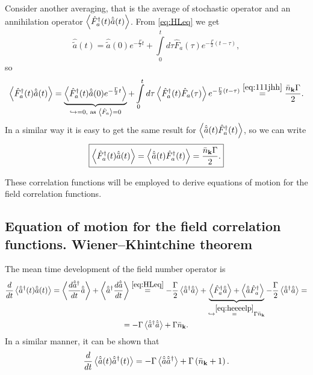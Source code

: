 Consider another averaging, that is the average of stochastic operator and an annihilation operator $\left\langle {\hat{F}_a^{\dagger}(t) \hat{\tilde{a}}(t)} \right\rangle$.
From \eqref{eq:HLeq} we get
\begin{equation}
	\hat{\tilde{a}}(t) = \hat{\tilde{a}}(0) e^{- \frac{\Gamma}{2}t} + \int \limits_0^t  d \tau \hat{F}_a(\tau)e^{- \frac{\Gamma}{2}(t - \tau)},
\end{equation}
so
\begin{equation}
	\left\langle {\hat{F}_a^{\dagger}(t) \hat{\tilde{a}}(t)} \right\rangle = \underbrace{\left\langle {\hat{F}_a^{\dagger}(t) \hat{\tilde{a}}(0)e^{- \frac{\Gamma}{2}t}} \right\rangle}_{\hookrightarrow=0, \text{ as } \left\langle {\hat{F}_a} \right\rangle=0} + \int \limits_0^t d\tau \left\langle {\hat{F}_a^{\dagger}(t) \hat{F}_a(\tau)} \right\rangle e^{- \frac{\Gamma}{2}(t - \tau)} \overset{\eqref{eq:111jhh}}{=} \frac{\bar{n}_{\mathbf{k}}\Gamma}{2}.
\end{equation}
In a similar way it is easy to get the same result for $\left\langle {\hat{\tilde{a}}(t) \hat{F}_a^{\dagger}(t) } \right\rangle$, so we can write
\begin{equation}
	\boxed{	\left\langle {\hat{F}_a^{\dagger}(t) \hat{\tilde{a}}(t)} \right\rangle = \left\langle {\hat{\tilde{a}}(t) \hat{F}_a^{\dagger}(t) } \right\rangle =  \frac{\bar{n}_{\mathbf{k}}\Gamma}{2}.}
	\label{eq:heeeelp}
\end{equation}

These correlation functions will be employed to derive equations of motion for the field correlation functions.

\subsection{Equation of motion for the field correlation functions. Wiener--Khintchine theorem}

The mean time development of the field number operator is
\begin{multline}
	\frac{d}{dt} \left\langle {\hat{\tilde{a}}^{\dagger}(t) \hat{\tilde{a}}(t)} \right\rangle  = \left\langle { \frac{d\hat{\tilde{a}}^{\dagger}}{dt} \hat{\tilde{a}}} \right\rangle + \left\langle {\hat{\tilde{a}}^{\dagger} \frac{d\hat{\tilde{a}}}{dt}} \right\rangle \overset{\eqref{eq:HLeq}}{=} - \frac{\Gamma}{2} \left\langle {\hat{\tilde{a}}^{\dagger} \hat{\tilde{a}}} \right\rangle + \underbrace{\left\langle {\hat{F}_a^{\dagger} \hat{\tilde{a}}} \right\rangle + \left\langle {\hat{\tilde{a}} \hat{F}_a^{\dagger}} \right\rangle}_{\hookrightarrow \overset{\eqref{eq:heeeelp}}{=} \Gamma \bar{n}_{\mathbf{k}}}  - \frac{\Gamma}{2} \left\langle {\hat{\tilde{a}}^{\dagger} \hat{\tilde{a}}} \right\rangle = \\ = - \Gamma \left\langle {\hat{\tilde{a}}^{\dagger} \hat{\tilde{a}}} \right\rangle + \Gamma \bar{n}_{\mathbf{k}}.
	\label{eq:dn}
\end{multline}
In a similar manner, it can be shown that
\begin{equation}
	\frac{d}{dt} \left\langle {\hat{\tilde{a}}(t) \hat{\tilde{a}}^{\dagger}(t)} \right\rangle = - \Gamma \left\langle {\hat{\tilde{a}} \hat{\tilde{a}}^{\dagger}} \right\rangle + \Gamma \left(\bar{n}_{\mathbf{k}}+1\right).
\end{equation}

